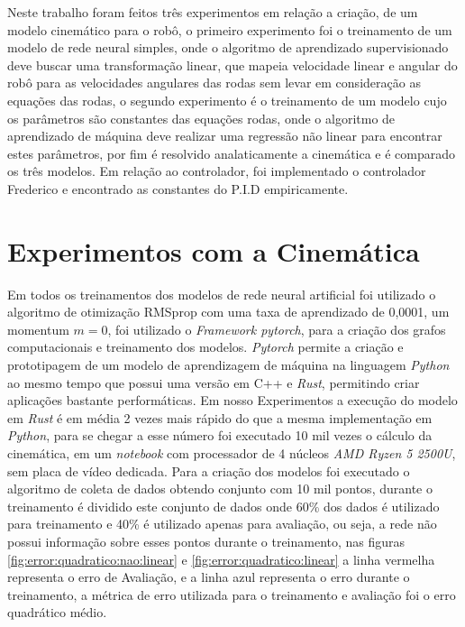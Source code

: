 
\label{Cap:ExperimentosResultados}
Neste trabalho foram feitos três experimentos em relação a criação,
de um modelo cinemático para o robô, o primeiro experimento foi o
treinamento de um modelo de rede neural simples, onde o algoritmo
de aprendizado supervisionado deve buscar uma transformação linear,
que mapeia velocidade linear e angular do robô para as velocidades
angulares das rodas sem levar em consideração as equações das rodas,
o segundo experimento é o treinamento de um modelo cujo os parâmetros
são constantes das equações rodas, onde o algoritmo de aprendizado
de máquina deve realizar uma regressão não linear para encontrar
estes parâmetros, por fim é resolvido analaticamente a cinemática
e é comparado os três modelos. Em relação ao controlador, foi implementado
o controlador Frederico e encontrado as constantes do P.I.D empiricamente.


\section{Experimentos com a Cinemática}
Em todos os treinamentos dos modelos
de rede neural artificial foi utilizado o algoritmo de otimização
RMSprop com uma taxa de aprendizado de 0,0001, um momentum $m =0$,
foi utilizado o \textit{Framework pytorch}, para a criação dos
grafos computacionais e treinamento dos modelos. \textit{Pytorch}
permite a criação e prototipagem de um modelo de aprendizagem de
máquina na linguagem \textit{Python} ao mesmo tempo que possui
uma versão em C++ e \textit{Rust}, permitindo criar aplicações
bastante performáticas. Em nosso Experimentos a execução do modelo
em \textit{Rust} é em média 2 vezes mais rápido do que a mesma implementação
em \textit{Python}, para se chegar a esse número foi executado 10 mil vezes o cálculo
da cinemática, em um \textit{notebook} com processador de 4 núcleos \textit{AMD Ryzen 5 2500U},
sem placa de vídeo dedicada. Para a criação dos modelos foi executado o
algoritmo de coleta de dados obtendo conjunto com 10 mil
pontos, durante o treinamento é dividido este conjunto de dados
onde 60\% dos dados é utilizado para treinamento e 40\% é utilizado
apenas para avaliação, ou seja, a rede não possui informação sobre esses
pontos durante o treinamento, nas figuras \ref{fig:error:quadratico:nao:linear} e
\ref{fig:error:quadratico:linear} a linha vermelha representa o erro de
Avaliação, e a linha azul representa o erro durante o treinamento,
a métrica de erro utilizada para o treinamento e avaliação
foi o erro quadrático médio.

